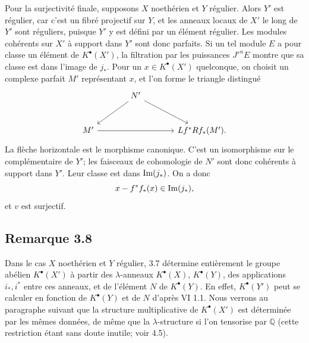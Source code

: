 \documentclass[11pt]{article}
\newcommand{\Fil}{\operatorname{Fil}}
\providecommand{\codim}{\operatorname{codim}}
\providecommand{\Q}{\mathbb Q}
\providecommand{\codim}{\operatorname{codim}}
\providecommand{\rank}{\operatorname{rank}}
\providecommand{\cO}{\mathcal O}
\begin{document}
Pour la surjectivité finale, supposons \(X\) noethérien et \(Y\) régulier. Alors \(Y'\) est régulier, car c'est un fibré projectif sur \(Y\), et les anneaux locaux de \(X'\) le long de \(Y'\) sont réguliers, puisque \(Y'\) y est défini par un élément régulier. Les modules cohérents sur \(X'\) à support dans \(Y'\) sont donc parfaits. Si un tel module \(E\) a pour classe un élément de \(K^\bullet(X')\), la filtration par les puissances \(J'^nE\) montre que sa classe est dans l'image de \(j_*\). Pour un \(x\in K^\bullet(X')\) quelconque, on choisit un complexe parfait \(M'\) représentant \(x\), et l'on forme le triangle distingué
\[
\begin{tikzcd}[column sep=large,row sep=large]
& N' \arrow[dl] \arrow[dr] &\\
M' \arrow[rr] && Lf^*Rf_*(M').
\end{tikzcd}
\]
La flèche horizontale est le morphisme canonique. C'est un isomorphisme sur le complémentaire de \(Y'\); les faisceaux de cohomologie de \(N'\) sont donc cohérents à support dans \(Y'\). Leur classe est dans \(\Imf(j_*)\). On a donc
\[
x-f^*f_*(x)\in\Imf(j_*),
\]
et \(v\) est surjectif.



\providecommand{\Q}{\mathbb Q}
\providecommand{\bfP}{\mathbf P}
\providecommand{\gr}{\operatorname{gr}}
\providecommand{\Id}{\operatorname{Id}}
\providecommand{\Fil}{\operatorname{Fil}}
\providecommand{\Imf}{\operatorname{Im}}
\providecommand{\rank}{\operatorname{rank}}
\providecommand{\codim}{\operatorname{codim}}
\providecommand{\cJ}{\mathcal J}
\providecommand{\cI}{\mathcal I}
\providecommand{\cN}{\mathcal N}
\providecommand{\cE}{\mathcal E}
\providecommand{\cO}{\mathcal O}


\subsection*{Remarque 3.8}

Dans le cas \(X\) noethérien et \(Y\) régulier, 3.7 détermine entièrement le groupe abélien \(K^\bullet(X')\) à partir des \(\lambda\)-anneaux \(K^\bullet(X)\), \(K^\bullet(Y)\), des applications \(i_*,i^*\) entre ces anneaux, et de l'élément \(N\) de \(K^\bullet(Y)\). En effet, \(K^\bullet(Y')\) peut se calculer en fonction de \(K^\bullet(Y)\) et de \(N\) d'après VI 1.1. Nous verrons au paragraphe suivant que la structure multiplicative de \(K^\bullet(X')\) est déterminée par les mêmes données, de même que la \(\lambda\)-structure si l'on tensorise par \(\mathbb Q\) (cette restriction étant sans doute inutile; voir 4.5).
\end{document}
